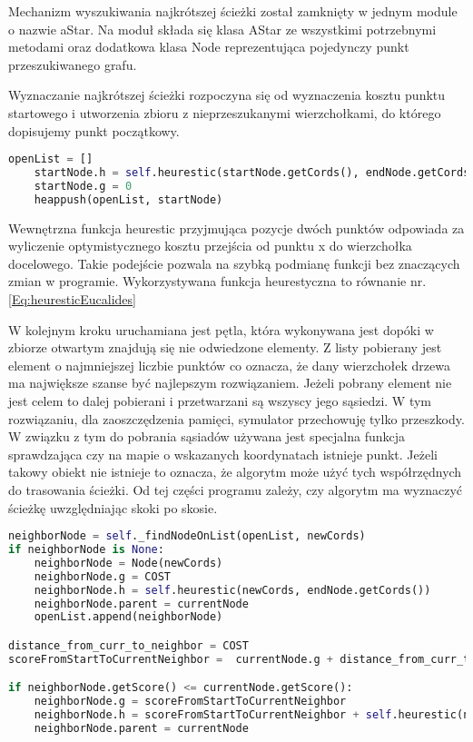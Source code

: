 Mechanizm wyszukiwania najkrótszej ścieżki został zamknięty w jednym module o nazwie aStar.
Na moduł składa się klasa AStar ze wszystkimi potrzebnymi metodami oraz dodatkowa klasa Node reprezentująca 
pojedynczy punkt przeszukiwanego grafu.

Wyznaczanie najkrótszej ścieżki rozpoczyna się od wyznaczenia kosztu punktu startowego i utworzenia zbioru z nieprzeszukanymi 
wierzchołkami, do którego dopisujemy punkt początkowy. 
\begin{lstlisting}[language=Python,caption=Przygotowanie danych,label={kodPython}]
    openList = []
    startNode.h = self.heurestic(startNode.getCords(), endNode.getCords())
    startNode.g = 0
    heappush(openList, startNode)
\end{lstlisting}

Wewnętrzna funkcja heurestic przyjmująca pozycje dwóch punktów odpowiada
za wyliczenie optymistycznego kosztu przejścia od punktu x do wierzchołka docelowego.
Takie podejście pozwala na szybką podmianę funkcji bez znaczących zmian w programie.
Wykorzystywana funkcja heurestyczna to równanie nr. \eqref{Eq:heuresticEucalides} 

W kolejnym kroku uruchamiana jest pętla, która wykonywana jest dopóki
w zbiorze otwartym znajdują się nie odwiedzone elementy. Z listy pobierany jest 
element o najmniejszej liczbie punktów co oznacza, że dany wierzchołek drzewa ma największe szanse być najlepszym rozwiązaniem.
Jeżeli pobrany element nie jest celem to dalej pobierani i przetwarzani są wszyscy jego sąsiedzi. 
W tym rozwiązaniu, dla zaoszczędzenia pamięci, symulator przechowuję tylko przeszkody.
W związku z tym do pobrania sąsiadów używana jest specjalna funkcja sprawdzająca czy na mapie o wskazanych koordynatach istnieje punkt. 
Jeżeli takowy obiekt nie istnieje to oznacza, że algorytm może użyć tych współrzędnych do trasowania ścieżki. 
Od tej części programu zależy, czy algorytm ma wyznaczyć ścieżkę uwzględniając skoki po skosie.

\begin{lstlisting}[language=Python,caption=Wyznaczenie kosztu ścieżki,label={kodPython2}]
neighborNode = self._findNodeOnList(openList, newCords)
if neighborNode is None:
    neighborNode = Node(newCords)
    neighborNode.g = COST
    neighborNode.h = self.heurestic(newCords, endNode.getCords())
    neighborNode.parent = currentNode
    openList.append(neighborNode)

distance_from_curr_to_neighbor = COST
scoreFromStartToCurrentNeighbor =  currentNode.g + distance_from_curr_to_neighbor

if neighborNode.getScore() <= currentNode.getScore():
    neighborNode.g = scoreFromStartToCurrentNeighbor
    neighborNode.h = scoreFromStartToCurrentNeighbor + self.heurestic(newCords, endNode.getCords())     
    neighborNode.parent = currentNode
\end{lstlisting}

